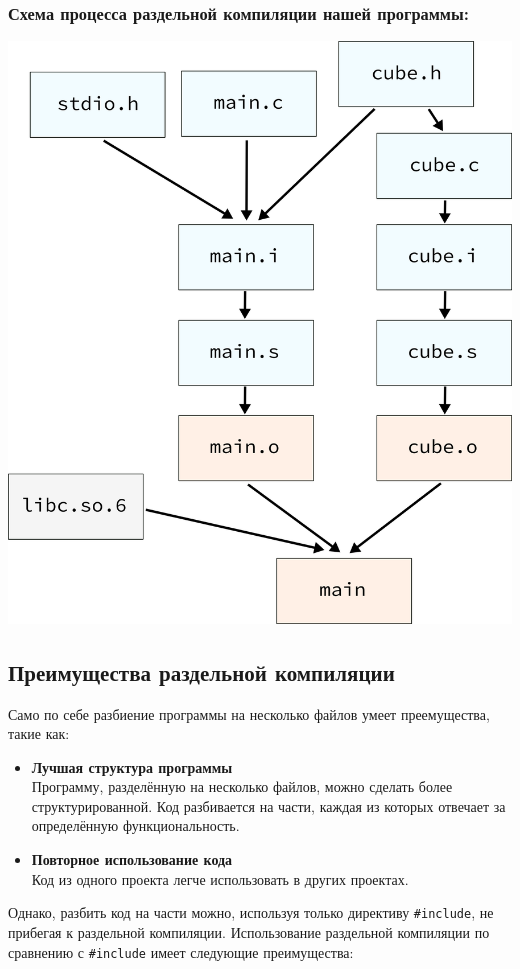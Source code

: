 \documentclass{article}
\begin{document}
\subsubsection*{Схема процесса раздельной компиляции нашей программы:}
\begin{center}
\includegraphics[scale=0.7]{../images/07stages_cube_separate.png}
\end{center}





\newpage
\subsection*{Преимущества раздельной компиляции}
Само по себе разбиение программы на несколько файлов умеет преемущества, такие как:
\begin{itemize}
\item \textbf{Лучшая структура программы}\\
Программу, разделённую на несколько файлов, можно сделать более структурированной. Код разбивается на части, каждая из которых отвечает за определённую функциональность.
\item \textbf{Повторное использование кода}\\
Код из одного проекта легче использовать в других проектах.
\end{itemize}
Однако, разбить код на части можно, используя только директиву \texttt{\#include}, не прибегая к раздельной компиляции. Использование раздельной компиляции по сравнению с \texttt{\#include} имеет следующие преимущества:
\end{document}
